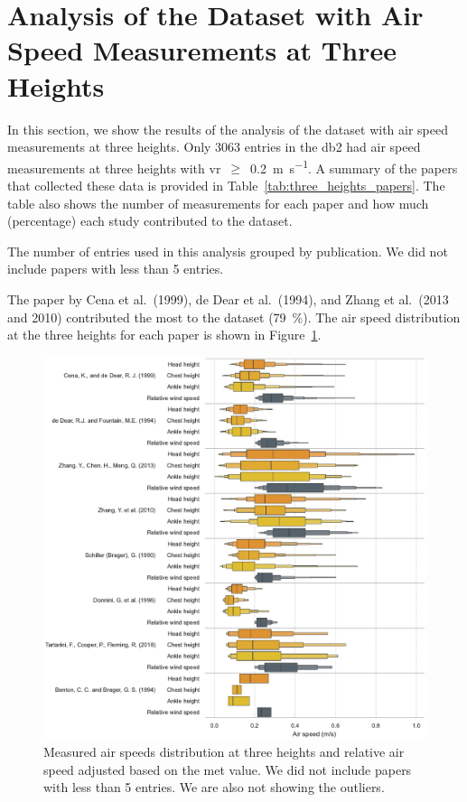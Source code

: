\appendix

\section{Analysis of the Dataset with Air Speed Measurements at Three Heights}\label{sec:analysis-of-the-dataset-with-air-speed-measurements-at-three-heights}

In this section, we show the results of the analysis of the dataset with air speed measurements at three heights.
Only \num{3063} entries in the \ac{db2} had air speed measurements at three heights with \ac{vr}~$\geq$~\qty{0.2}{\m\per\s}.
A summary of the papers that collected these data is provided in Table~\ref{tab:three_heights_papers}.
The table also shows the number of measurements for each paper and how much (percentage) each study contributed to the dataset.
\begin{table}[htb!]
    \centering
    
    \caption{The number of entries used in this analysis grouped by publication.
    We did not include papers with less than \num{5} entries.}
    \label{tab:three_heights_papers}
\end{table}
The paper by Cena et al.\ (1999), de Dear et al.\ (1994), and Zhang et al.\ (2013 and 2010) contributed the most to the dataset (\qty{79}{\percent}).
The air speed distribution at the three heights for each paper is shown in Figure~\ref{fig:boxenplot_wind_speed_three_heights}.
\begin{figure}[htb!]
    \centering
    \includegraphics[width=\textwidth]{figures/boxenplot_wind_speed_three_heights}
    \caption{Measured air speeds distribution at three heights and relative air speed adjusted based on the \ac{met} value.
    We did not include papers with less than \num{5} entries.
    We are also not showing the outliers.}
    \label{fig:boxenplot_wind_speed_three_heights}
\end{figure}
